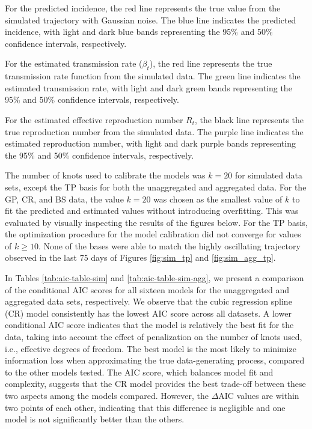 \documentclass[
11pt, %
oneside, %
english, %
singlespacing, %
]{macthesis} %
\begin{document}
For the predicted incidence, the red line represents the true value from the simulated trajectory with Gaussian noise. The blue line indicates the predicted incidence, with light and dark blue bands representing the 95\% and 50\% confidence intervals, respectively.

For the estimated transmission rate (\(\beta_t\)), the red line represents the true transmission rate function from the simulated data. The green line indicates the estimated transmission rate, with light and dark green bands representing the 95\% and 50\% confidence intervals, respectively.

For the estimated effective reproduction number \(R_t\), the black line represents the true reproduction number from the simulated data. The purple line indicates the estimated reproduction number, with light and dark purple bands representing the 95\% and 50\% confidence intervals, respectively.

The number of knots used to calibrate the models was \(k =20\) for simulated data sets, except the TP basis for both the unaggregated and aggregated data. For the GP, CR, and BS data, the value \(k =20\) was chosen as the smallest value of \(k\) to fit the predicted and estimated values without introducing overfitting. This was evaluated by visually inspecting the results of the figures below. For the TP basis, the optimization procedure for the model calibration did not converge for values of \(k \geq 10\). None of the bases were able to match the highly oscillating trajectory observed in the last 75 days of Figures \ref{fig:sim_tp} and \ref{fig:sim_agg_tp}.

In Tables \ref{tab:aic-table-sim} and \ref{tab:aic-table-sim-agg}, we present a comparison of the conditional AIC scores for all sixteen models for the unaggregated and aggregated data sets, respectively. We observe that the cubic regression spline (CR) model consistently has the lowest AIC score across all datasets. A lower conditional AIC score indicates that the model is relatively the best fit for the data, taking into account the effect of penalization on the number of knots used, i.e., effective degrees of freedom. The best model is the most likely to minimize information loss when approximating the true data-generating process, compared to the other models tested. The AIC score, which balances model fit and complexity, suggests that the CR model provides the best trade-off between these two aspects among the models compared. However, the \(\Delta\text{AIC}\) values are within two points of each other, indicating that this difference is negligible and one model is not significantly better than the others.
\end{document}
